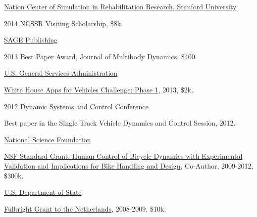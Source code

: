 \documentclass[10pt]{article}
\newenvironment{innerlist}[1][\enskip\textbullet]%
        {\begin{compactitem}[#1]}{\end{compactitem}}
\newcommand{\blankline}{\quad\pagebreak[2]}
\begin{document}
\href{http://opensim.stanford.edu/}{Nation Center of Simulation in
  Rehabilitation Research, Stanford University}
\begin{innerlist}
  \item 2014 NCSSR Visiting Scholarship, \$8k.
\end{innerlist}

\blankline

\href{http://sagepub.com/}{SAGE Publishing}
\begin{innerlist}
  \item 2013 Best Paper Award, Journal of Multibody Dynamics, \$400.
\end{innerlist}

\blankline

\href{http://gsa.gov/}{U.S. General Services Administration}
\begin{innerlist}
  \item \href{http://appsforvehicles.challenge.gov/}{White House Apps for
    Vehicles Challenge: Phase 1}, 2013, \$2k.
\end{innerlist}

\blankline

\href{http://mne.psu.edu/dscc2012/}{2012 Dynamic Systems and Control Conference}
\begin{innerlist}
  \item Best paper in the Single Track Vehicle Dynamics and Control Session,
    2012.
\end{innerlist}

\blankline

\href{http://nsf.gov/}{National Science Foundation}
\begin{innerlist}
  \item \href{http://nsf.gov/awardsearch/showAward.do?AwardNumber=0928339}{NSF
    Standard Grant: Human Control of Bicycle Dynamics with Experimental
    Validation and Implications for Bike Handling and Design}, Co-Author,
    2009-2012, \$300k.
\end{innerlist}

\blankline

\href{http://exchanges.state.gov/}{U.S. Department of State}
\begin{innerlist}
  \item \href{http://fulbright.state.gov/}{Fulbright Grant to the Netherlands},
    2008-2009, \$10k.
\end{innerlist}

\blankline
\end{document}
